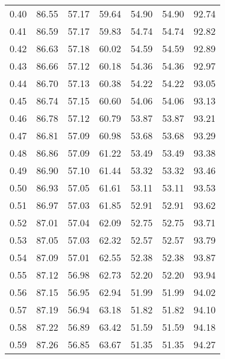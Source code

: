 \begin{tabular}{|c|c|c|c|c|c|c|}
      0.40 &     86.55 &     57.17 &      59.64 &   54.90 &      54.90 &         92.74 \\
      0.41 &     86.59 &     57.17 &      59.83 &   54.74 &      54.74 &         92.82 \\
      0.42 &     86.63 &     57.18 &      60.02 &   54.59 &      54.59 &         92.89 \\
      0.43 &     86.66 &     57.12 &      60.18 &   54.36 &      54.36 &         92.97 \\
      0.44 &     86.70 &     57.13 &      60.38 &   54.22 &      54.22 &         93.05 \\
      0.45 &     86.74 &     57.15 &      60.60 &   54.06 &      54.06 &         93.13 \\
      0.46 &     86.78 &     57.12 &      60.79 &   53.87 &      53.87 &         93.21 \\
      0.47 &     86.81 &     57.09 &      60.98 &   53.68 &      53.68 &         93.29 \\
      0.48 &     86.86 &     57.09 &      61.22 &   53.49 &      53.49 &         93.38 \\
      0.49 &     86.90 &     57.10 &      61.44 &   53.32 &      53.32 &         93.46 \\
      0.50 &     86.93 &     57.05 &      61.61 &   53.11 &      53.11 &         93.53 \\
      0.51 &     86.97 &     57.03 &      61.85 &   52.91 &      52.91 &         93.62 \\
      0.52 &     87.01 &     57.04 &      62.09 &   52.75 &      52.75 &         93.71 \\
      0.53 &     87.05 &     57.03 &      62.32 &   52.57 &      52.57 &         93.79 \\
      0.54 &     87.09 &     57.01 &      62.55 &   52.38 &      52.38 &         93.87 \\
      0.55 &     87.12 &     56.98 &      62.73 &   52.20 &      52.20 &         93.94 \\
      0.56 &     87.15 &     56.95 &      62.94 &   51.99 &      51.99 &         94.02 \\
      0.57 &     87.19 &     56.94 &      63.18 &   51.82 &      51.82 &         94.10 \\
      0.58 &     87.22 &     56.89 &      63.42 &   51.59 &      51.59 &         94.18 \\
      0.59 &     87.26 &     56.85 &      63.67 &   51.35 &      51.35 &         94.27 \\

\end{tabular}
